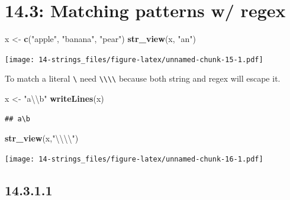 \documentclass[]{book}
\newenvironment{Shaded}{\begin{snugshade}}{\end{snugshade}}
\newcommand{\CharTok}[1]{\textcolor[rgb]{0.31,0.60,0.02}{#1}}
\newcommand{\KeywordTok}[1]{\textcolor[rgb]{0.13,0.29,0.53}{\textbf{#1}}}
\newcommand{\NormalTok}[1]{#1}
\newcommand{\StringTok}[1]{\textcolor[rgb]{0.31,0.60,0.02}{#1}}
\theoremstyle{definition}
\theoremstyle{definition}
\theoremstyle{definition}
\theoremstyle{remark}
\begin{document}
\hypertarget{matching-patterns-w-regex}{%
\section{14.3: Matching patterns w/
regex}\label{matching-patterns-w-regex}}

\begin{Shaded}
\begin{Highlighting}[]
\NormalTok{x <-}\StringTok{ }\KeywordTok{c}\NormalTok{(}\StringTok{"apple"}\NormalTok{, }\StringTok{"banana"}\NormalTok{, }\StringTok{"pear"}\NormalTok{)}
\KeywordTok{str_view}\NormalTok{(x, }\StringTok{"an"}\NormalTok{)}
\end{Highlighting}
\end{Shaded}

\texttt{[image: 14-strings\_files/figure-latex/unnamed-chunk-15-1.pdf]}

To match a literal \texttt{\textbackslash{}} need
\texttt{\textbackslash{}\textbackslash{}\textbackslash{}\textbackslash{}}
because both string and regex will escape it.

\begin{Shaded}
\begin{Highlighting}[]
\NormalTok{x <-}\StringTok{ "a}\CharTok{\textbackslash{}\textbackslash{}}\StringTok{b"}
\KeywordTok{writeLines}\NormalTok{(x)}
\end{Highlighting}
\end{Shaded}

\begin{verbatim}
## a\b
\end{verbatim}

\begin{Shaded}
\begin{Highlighting}[]
\KeywordTok{str_view}\NormalTok{(x,}\StringTok{"}\CharTok{\textbackslash{}\textbackslash{}\textbackslash{}\textbackslash{}}\StringTok{"}\NormalTok{)}
\end{Highlighting}
\end{Shaded}

\texttt{[image: 14-strings\_files/figure-latex/unnamed-chunk-16-1.pdf]}

\hypertarget{section-41}{%
\subsection{14.3.1.1}\label{section-41}}
\end{document}
